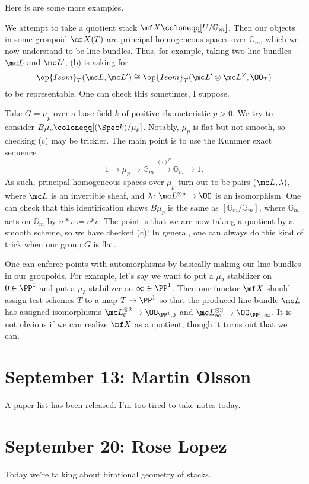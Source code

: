 \documentclass{article}
\begin{document}
Here is are some more examples.
\begin{example}
    We attempt to take a quotient stack $\mf X\coloneqq[U/\mathbb G_m]$. Then our objects in some groupoid $\mf X(T)$ are principal homogeneous spaces over $\mathbb G_m$, which we now understand to be line bundles. Thus, for example, taking two line bundles $\mc L$ and $\mc L'$, (b) is asking for
    \[\op{Isom}_T(\mc L,\mc L')\cong\op{Isom}_T(\mc L'\otimes\mc L^\lor,\OO_T)\]
    to be representable. One can check this sometimes, I suppose.
\end{example}
\begin{example}
    Take $G=\mu_p$ over a base field $k$ of positive characteristic $p>0$. We try to consider $B\mu_p\coloneqq[(\Spec k)/\mu_p]$. Notably, $\mu_p$ is flat but not smooth, so checking (c) may be trickier. The main point is to use the Kummer exact sequence
    \[1\to\mu_p\to\mathbb G_m\stackrel{(\cdot)^p}\to\mathbb G_m\to1.\]
    As such, principal homogeneous spaces over $\mu_p$ turn out to be pairs $(\mc L,\lambda)$, where $\mc L$ is an invertible sheaf, and $\lambda\colon\mc L^{\otimes p}\to\OO$ is an isomorphism. One can check that this identification shows $B\mu_p$ is the same as $[\mathbb G_m/\mathbb G_m]$, where $\mathbb G_m$ acts on $\mathbb G_m$ by $u*v\coloneqq u^pv$. The point is that we are now taking a quotient by a smooth scheme, so we have checked (c)! In general, one can always do this kind of trick when our group $G$ is flat.
\end{example}
\begin{example}
    One can enforce points with automorphisms by basically making our line bundles in our groupoids. For example, let's say we want to put a $\mu_2$ stabilizer on $0\in\PP^1$ and put a $\mu_3$ stabilizer on $\infty\in\PP^1$. Then our functor $\mf X$ should assign test schemes $T$ to a map $T\to\PP^1$ so that the produced line bundle $\mc L$ has assigned isomorphisms $\mc L_0^{\otimes2}\to\OO_{\PP^1,0}$ and $\mc L_\infty^{\otimes3}\to\OO_{\PP^1,\infty}$. It is not obvious if we can realize $\mf X$ as a quotient, though it turns out that we can.
\end{example}

\section{September 13: Martin Olsson}
A paper list has been released. I'm too tired to take notes today.

\section{September 20: Rose Lopez}
Today we're talking about birational geometry of stacks.
\end{document}
